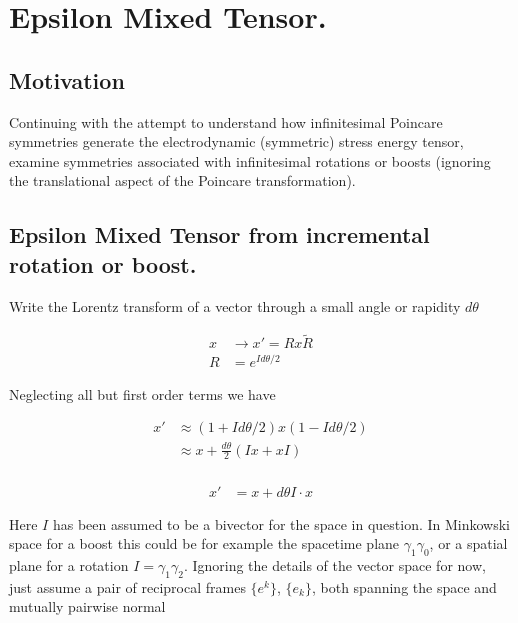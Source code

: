 %

\chapter{Epsilon Mixed Tensor.}
\label{chap:epsilonMixed}
\date{July 14, 2009}

\beginArtWithToc

\section{Motivation}

Continuing with the attempt to understand how infinitesimal Poincare
symmetries generate the electrodynamic (symmetric) stress energy
tensor, examine symmetries associated with infinitesimal rotations 
or boosts (ignoring the translational aspect of the Poincare transformation).

\section{Epsilon Mixed Tensor from incremental rotation or boost.}

Write the Lorentz transform of a vector through a small angle or rapidity $d\theta$

\begin{align*}
x &\rightarrow x' = R x \tilde{R} \\
R &= e^{I d\theta/2}
\end{align*}

Neglecting all but first order terms we have

\begin{align*}
x' 
&\approx (1 + Id\theta/2)x(1 - Id\theta/2) \\
&\approx x + \frac{d\theta}{2}(I x + x I) \\
\end{align*}

\begin{align}\label{eqn:incremental}
x' &= x + {d\theta} I \cdot x
\end{align}

Here $I$ has been assumed to be a bivector for the space in question.  In Minkowski space for a boost this could be for example the spacetime plane $\gamma_1 \gamma_0$, or a spatial plane for a rotation $I = \gamma_1 \gamma_2$.  Ignoring the details of the vector space for now, just assume a pair of reciprocal frames $\{e^k\}$, $\{e_k\}$, both spanning the space and mutually pairwise
normal

